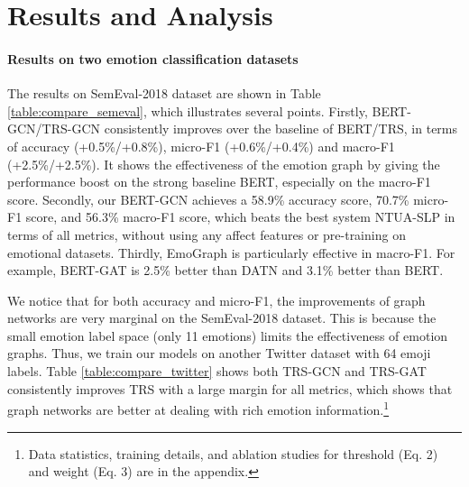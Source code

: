 \documentclass[11pt,a4paper]{article}
\begin{document}
\section{Results and Analysis}

\paragraph{Results on two emotion classification datasets} The results on SemEval-2018 dataset are shown in Table \ref{table:compare_semeval}, which illustrates several points. Firstly, BERT-GCN/TRS-GCN consistently improves over the baseline of BERT/TRS, in terms of accuracy (+0.5\%/+0.8\%), micro-F1 (+0.6\%/+0.4\%) and macro-F1 (+2.5\%/+2.5\%). It shows the effectiveness of the emotion graph by giving the performance boost on the strong baseline BERT, especially on the macro-F1 score.
Secondly, our BERT-GCN achieves a 58.9\% accuracy score, 70.7\% micro-F1 score, and 56.3\% macro-F1 score, which beats the best system NTUA-SLP in terms of all metrics, without using any affect features or pre-training on emotional datasets. 
Thirdly, EmoGraph is particularly effective in macro-F1. For example, BERT-GAT is 2.5\% better than DATN and 3.1\% better than BERT.

We notice that for both accuracy and micro-F1, the improvements of graph networks are very marginal on the SemEval-2018 dataset. This is because the small emotion label space (only 11 emotions) limits the effectiveness of emotion graphs.
Thus, we train our models on another Twitter dataset with 64 emoji labels. Table \ref{table:compare_twitter} shows both TRS-GCN and TRS-GAT consistently improves TRS with a large margin for all metrics, which shows that graph networks are better at dealing with rich emotion information.\footnote{Data statistics, training details, and ablation studies for threshold  (Eq. 2) and weight  (Eq. 3) are in the appendix.}




\begin{table}[t]
\centering
{}
\caption{ Comparison of F1 scores between BERT-GAT, BERT-GCN and BERT for ``surprise" and ``trust".}
\label{table:compare_semeval_bert}
\end{table}
\end{document}
